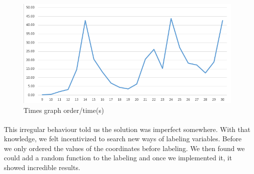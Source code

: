 \documentclass[runningheads]{llncs}
\begin{document}
\begin{figure}
    \begin{center}
        \includegraphics[scale=0.38]{images/graph.png}
        \caption{Times graph order/time(s)} \label{fig5}
    \end{center}
\end{figure}

\paragraph{}
This irregular behaviour told us the solution was imperfect somewhere. With that knowledge, we felt incentivized to search new ways of labeling variables.
Before we only ordered the values of the coordinates before labeling.
We then found we could add a random function to the labeling and once we implemented it, it showed incredible results.
\end{document}
